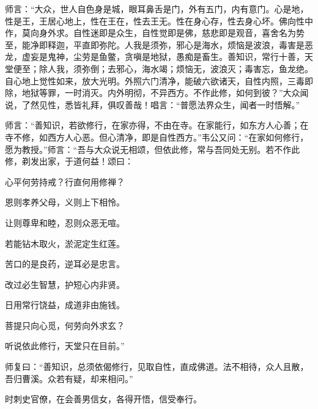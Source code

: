 \documentclass[12pt,twoside,openany]{book}
\begin{document}
师言：“大众，世人自色身是城，眼耳鼻舌是门，外有五门，内有意门。心是地，性是王，王居心地上，性在王在，性去王无。性在身心存，性去身心坏。佛向性中作，莫向身外求。自性迷即是众生，自性觉即是佛，慈悲即是观音，喜舍名为势至，能净即释迦，平直即弥陀。人我是须弥，邪心是海水，烦恼是波浪，毒害是恶龙，虚妄是鬼神，尘劳是鱼鳖，贪嗔是地狱，愚痴是畜生。善知识，常行十善，天堂便至；除人我，须弥倒；去邪心，海水竭；烦恼无，波浪灭；毒害忘，鱼龙绝。自心地上觉性如来，放大光明。外照六门清净，能破六欲诸天，自性内照，三毒即除，地狱等罪，一时消灭。内外明彻，不异西方。不作此修，如何到彼？”大众闻说，了然见性，悉皆礼拜，俱叹善哉！唱言：“普愿法界众生，闻者一时悟解。”

师言：“善知识，若欲修行，在家亦得，不由在寺。在家能行，如东方人心善；在寺不修，如西方人心恶。但心清净，即是自性西方。”韦公又问：“在家如何修行，愿为教授。”师言：“吾与大众说无相颂，但依此修，常与吾同处无别。若不作此修，剃发出家，于道何益！颂曰：

心平何劳持戒？行直何用修禅？

恩则孝养父母，义则上下相怜。

让则尊卑和睦，忍则众恶无喧。

若能钻木取火，淤泥定生红莲。

苦口的是良药，逆耳必是忠言。

改过必生智慧，护短心内非贤。

日用常行饶益，成道非由施钱。

菩提只向心觅，何劳向外求玄？

听说依此修行，天堂只在目前。”

师复曰：“善知识，总须依偈修行，见取自性，直成佛道。法不相待，众人且散，吾归曹溪。众若有疑，却来相问。”

时刺史官僚，在会善男信女，各得开悟，信受奉行。
\end{document}
